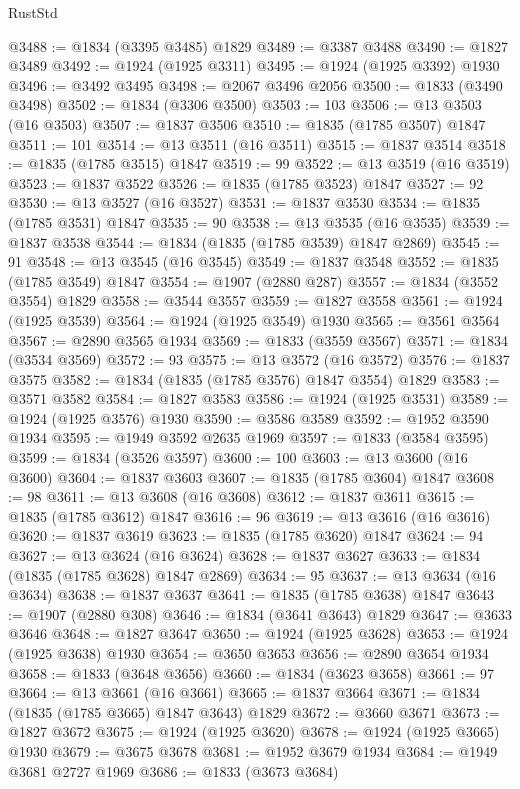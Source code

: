 \begin{lexlean}{RustStd}
\begin{coremodule}
@3488 := @1834 (@3395 @3485) @1829
@3489 := @3387 @3488
@3490 := @1827 @3489
@3492 := @1924 (@1925 @3311)
@3495 := @1924 (@1925 @3392) @1930
@3496 := @3492 @3495
@3498 := @2067 @3496 @2056
@3500 := @1833 (@3490 @3498)
@3502 := @1834 (@3306 @3500)
@3503 := 103
@3506 := @13 @3503 (@16 @3503)
@3507 := @1837 @3506
@3510 := @1835 (@1785 @3507) @1847
@3511 := 101
@3514 := @13 @3511 (@16 @3511)
@3515 := @1837 @3514
@3518 := @1835 (@1785 @3515) @1847
@3519 := 99
@3522 := @13 @3519 (@16 @3519)
@3523 := @1837 @3522
@3526 := @1835 (@1785 @3523) @1847
@3527 := 92
@3530 := @13 @3527 (@16 @3527)
@3531 := @1837 @3530
@3534 := @1835 (@1785 @3531) @1847
@3535 := 90
@3538 := @13 @3535 (@16 @3535)
@3539 := @1837 @3538
@3544 := @1834 (@1835 (@1785 @3539) @1847 @2869)
@3545 := 91
@3548 := @13 @3545 (@16 @3545)
@3549 := @1837 @3548
@3552 := @1835 (@1785 @3549) @1847
@3554 := @1907 (@2880 @287)
@3557 := @1834 (@3552 @3554) @1829
@3558 := @3544 @3557
@3559 := @1827 @3558
@3561 := @1924 (@1925 @3539)
@3564 := @1924 (@1925 @3549) @1930
@3565 := @3561 @3564
@3567 := @2890 @3565 @1934
@3569 := @1833 (@3559 @3567)
@3571 := @1834 (@3534 @3569)
@3572 := 93
@3575 := @13 @3572 (@16 @3572)
@3576 := @1837 @3575
@3582 := @1834 (@1835 (@1785 @3576) @1847 @3554) @1829
@3583 := @3571 @3582
@3584 := @1827 @3583
@3586 := @1924 (@1925 @3531)
@3589 := @1924 (@1925 @3576) @1930
@3590 := @3586 @3589
@3592 := @1952 @3590 @1934
@3595 := @1949 @3592 @2635 @1969
@3597 := @1833 (@3584 @3595)
@3599 := @1834 (@3526 @3597)
@3600 := 100
@3603 := @13 @3600 (@16 @3600)
@3604 := @1837 @3603
@3607 := @1835 (@1785 @3604) @1847
@3608 := 98
@3611 := @13 @3608 (@16 @3608)
@3612 := @1837 @3611
@3615 := @1835 (@1785 @3612) @1847
@3616 := 96
@3619 := @13 @3616 (@16 @3616)
@3620 := @1837 @3619
@3623 := @1835 (@1785 @3620) @1847
@3624 := 94
@3627 := @13 @3624 (@16 @3624)
@3628 := @1837 @3627
@3633 := @1834 (@1835 (@1785 @3628) @1847 @2869)
@3634 := 95
@3637 := @13 @3634 (@16 @3634)
@3638 := @1837 @3637
@3641 := @1835 (@1785 @3638) @1847
@3643 := @1907 (@2880 @308)
@3646 := @1834 (@3641 @3643) @1829
@3647 := @3633 @3646
@3648 := @1827 @3647
@3650 := @1924 (@1925 @3628)
@3653 := @1924 (@1925 @3638) @1930
@3654 := @3650 @3653
@3656 := @2890 @3654 @1934
@3658 := @1833 (@3648 @3656)
@3660 := @1834 (@3623 @3658)
@3661 := 97
@3664 := @13 @3661 (@16 @3661)
@3665 := @1837 @3664
@3671 := @1834 (@1835 (@1785 @3665) @1847 @3643) @1829
@3672 := @3660 @3671
@3673 := @1827 @3672
@3675 := @1924 (@1925 @3620)
@3678 := @1924 (@1925 @3665) @1930
@3679 := @3675 @3678
@3681 := @1952 @3679 @1934
@3684 := @1949 @3681 @2727 @1969
@3686 := @1833 (@3673 @3684)

\end{coremodule}
\end{lexlean}
